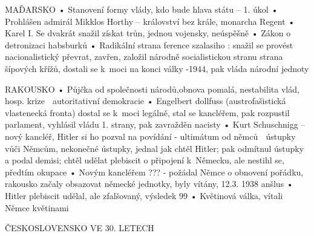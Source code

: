 \documentclass{article}
\begin{document}
MAĎARSKO
    • Stanovení formy vlády, kdo bude hlava státu – 1. úkol
    • Prohlášen admirál Mikklos Horthy – království bez krále, monarcha Regent
    • Karel I. Se dvakrát snažil získat trůn, jednou vojensky, neúspěšně
    • Zákon o detronizaci habsburků
    • Radikální strana ference szalasiho : snažil se provést nacionalistický převrat, zavřen, založil národně socialistickou stranu strana šípových křížů, dostali se k moci na konci války -1944, pak vláda národní jednoty

RAKOUSKO
    • Půjčka od společnosti národů,obnova pomalá, nestabilita vlád, hosp. krize  autoritativní demokracie
    • Engelbert dollfuss (austrofašistická vlastenecká fronta) dostal se k moci legálně, stal se kancléřem, pak rozpustil parlament, vyhlásil vládu 1. strany, pak zavražděn nacisty
    • Kurt Schuschnigg – nový kancléř, Hitler si ho pozval na povídání - ultimátum od němců  ústupky vůči Němcům, nekonečné ústupky, jednal jak chtěl Hitler; pak odmítnul ústupky a podal demisi; chtěl udělat plebiscit o připojení k Německu, ale nestihl se, předtím okupace
    • Novým kancléřem ??? - požádal Němce o obnovení pořádku, rakousko začaly obsazovat německé jednotky, byly vítány, 12.3. 1938 anšlus
    • Hitler plebiscit udělal, ale zfalšovaný, výsledek 99 %
    • Květinová válka, vítali Němce květinami

ČESKOSLOVENSKO VE 30. LETECH
\end{document}
